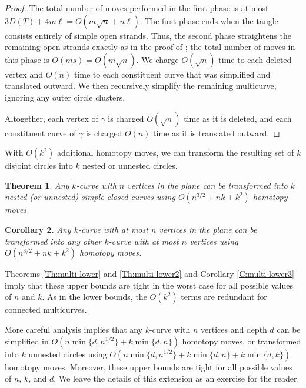 \documentclass[11pt,twoside]{article}
\def\set#1{\{ #1 \}}
\let\EDIT\relax
\newtheorem{theorem}{Theorem}[section]
\newtheorem{corollary}[theorem]{Corollary}
\numberwithin{figure}{section}
\begin{document}
\begin{proof}
The total number of moves performed in the first phase is at most $3D(T) + 4m\ell = O(m\sqrt{n} + n\ell)$.  The first phase ends when the tangle consists entirely of simple open strands.  Thus, the second phase straightens the remaining open strands exactly as in the proof of \EDIT{Lemma \ref{L:pretangle}}; the total number of moves in this phase is $O(ms) = O(m\sqrt{n})$.  We charge $O(\sqrt{n})$ time to each deleted vertex and $O(n)$ time to each constituent curve that was simplified and translated outward.  We then recursively simplify the remaining multicurve, ignoring any outer circle clusters.

Altogether, each vertex of $\gamma$ is charged $O(\sqrt{n})$ time as it is deleted, and each constituent curve of $\gamma$ is charged $O(n)$ time as it is translated outward.
\end{proof}

With $O(k^2)$ additional homotopy moves, we can transform the resulting set of $k$ disjoint circles into $k$ nested or unnested circles.

\begin{theorem}
\label{Th:multi-upper2}
Any $k$-curve with $n$ vertices in the plane can be transformed into $k$ nested (or unnested) simple closed curves using $O(n^{3/2} + nk + k^2)$ homotopy moves.
\end{theorem}

\begin{corollary}
\label{C:multi-upper3}
Any $k$-curve with at most $n$ vertices in the plane can be transformed into any other $k$-curve with at most $n$ vertices using $O(n^{3/2} + nk + k^2)$ homotopy moves.
\end{corollary}

Theorems \ref{Th:multi-lower} and \ref{Th:multi-lower2} and Corollary \ref{C:multi-lower3} imply that these upper bounds are tight in the worst case for all possible values of $n$ and $k$.  As in the lower bounds, the $O(k^2)$ terms are redundant for connected multicurves.

More careful analysis implies that any $k$-curve with $n$ vertices and depth $d$ can be simplified in $O(n \min\set{d, n^{1/2}} + k\min\set{d, n})$ homotopy moves, or transformed into $k$ unnested circles using $O(n \min\set{d, n^{1/2}} + k \min\set{d, n} + k \min\set{d, k})$ homotopy moves.  Moreover, these upper bounds are tight for all possible values of $n$, $k$, and $d$.  We leave the details of this extension as an exercise for the reader.
\end{document}
